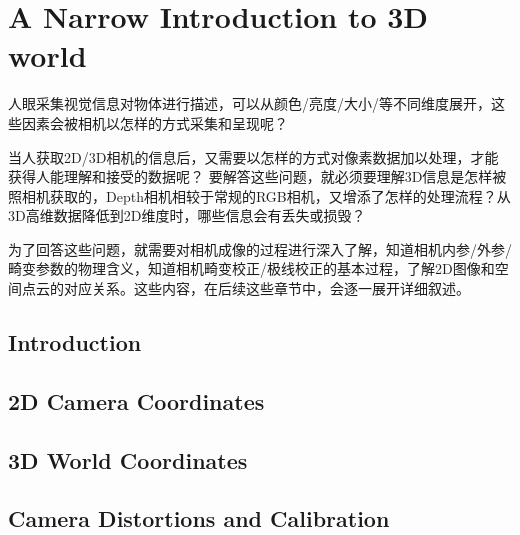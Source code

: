  

\chapter[Preface]{A Narrow Introduction to 3D world}
人眼采集视觉信息对物体进行描述，可以从颜色/亮度/大小/等不同维度展开，这些因素会被相机以怎样的方式采集和呈现呢？\par
当人获取2D/3D相机的信息后，又需要以怎样的方式对像素数据加以处理，才能获得人能理解和接受的数据呢？
要解答这些问题，就必须要理解3D信息是怎样被照相机获取的，Depth相机相较于常规的RGB相机，又增添了怎样的处理流程？从3D高维数据降低到2D维度时，哪些信息会有丢失或损毁？\par
为了回答这些问题，就需要对相机成像的过程进行深入了解，知道相机内参/外参/畸变参数的物理含义，知道相机畸变校正/极线校正的基本过程，了解2D图像和空间点云的对应关系。这些内容，在后续这些章节中，会逐一展开详细叙述。

\section{Introduction}

\section{2D Camera Coordinates}
\section{3D World Coordinates}
\section{Camera Distortions and Calibration}


